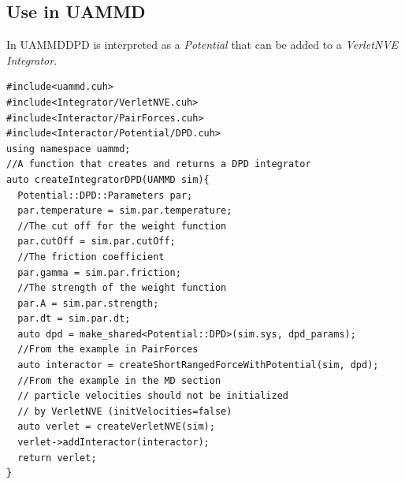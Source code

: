 \documentclass[ twoside,openright,titlepage,numbers=noenddot,%
headinclude,footinclude,cleardoublepage=empty,abstract=on,
BCOR=5mm,paper=a4,fontsize=11pt, dvipsnames
]{scrreprt}
\newcommand{\uammd}{\gls{UAMMD}\xspace}
\begin{document}
\subsection{Use in UAMMD}
In \uammd \gls{DPD} is interpreted as a \emph{Potential} that can be added to a \emph{VerletNVE} \emph{Integrator}.

\begin{verbatim}
#include<uammd.cuh>
#include<Integrator/VerletNVE.cuh>
#include<Interactor/PairForces.cuh>
#include<Interactor/Potential/DPD.cuh>
using namespace uammd;
//A function that creates and returns a DPD integrator
auto createIntegratorDPD(UAMMD sim){   
  Potential::DPD::Parameters par;
  par.temperature = sim.par.temperature;
  //The cut off for the weight function
  par.cutOff = sim.par.cutOff;
  //The friction coefficient
  par.gamma = sim.par.friction; 
  //The strength of the weight function
  par.A = sim.par.strength; 
  par.dt = sim.par.dt;  
  auto dpd = make_shared<Potential::DPD>(sim.sys, dpd_params);
  //From the example in PairForces
  auto interactor = createShortRangedForceWithPotential(sim, dpd);
  //From the example in the MD section
  // particle velocities should not be initialized
  // by VerletNVE (initVelocities=false)
  auto verlet = createVerletNVE(sim);
  verlet->addInteractor(interactor);
  return verlet;
}
\end{verbatim}
\end{document}
